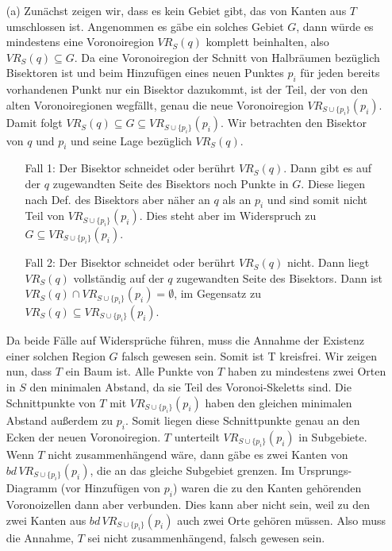 \documentclass{article}
\begin{document}
\begin{itemize}
\item[(a)] Zun\"achst zeigen wir, dass es kein Gebiet gibt, das von Kanten aus $T$ umschlossen ist. Angenommen es g\"abe ein solches Gebiet $G$, dann w\"urde es mindestens eine Voronoiregion $VR_S(q)$ komplett beinhalten, also $VR_S(q) \subseteq G$. Da eine Voronoiregion der Schnitt von Halbr\"aumen bez\"uglich Bisektoren ist und beim Hinzuf\"ugen eines neuen Punktes $p_i$ f\"ur jeden bereits vorhandenen Punkt nur ein Bisektor dazukommt, ist der Teil, der von den alten Voronoiregionen wegf\"allt, genau die neue Voronoiregion $VR_{S\cup\{p_i\}}(p_i)$. Damit folgt $VR_S(q) \subseteq G \subseteq VR_{S\cup\{p_i\}}(p_i)$. Wir betrachten den Bisektor von $q$ und $p_i$ und seine Lage bez\"uglich $VR_S(q)$.
\begin{itemize}
\item[Fall 1:] Der Bisektor schneidet oder ber\"uhrt $VR_S(q)$. Dann gibt es auf der $q$ zugewandten Seite des Bisektors noch Punkte in $G$. Diese liegen nach Def. des Bisektors aber n\"aher an $q$ als an $p_i$ und sind somit nicht Teil von $VR_{S\cup\{p_i\}}(p_i)$. Dies steht aber im Widerspruch zu $G \subseteq VR_{S\cup\{p_i\}}(p_i)$.
\item[Fall 2:] Der Bisektor schneidet oder ber\"uhrt $VR_S(q)$ nicht. Dann liegt $VR_S(q)$ vollst\"andig auf der $q$ zugewandten Seite des Bisektors. Dann ist $VR_S(q) \cap VR_{S\cup\{p_i\}}(p_i) = \emptyset$, im Gegensatz zu $VR_S(q) \subseteq VR_{S\cup\{p_i\}}(p_i)$.
\end{itemize}
Da beide F\"alle auf Widerspr\"uche f\"uhren, muss die Annahme der Existenz einer solchen Region $G$ falsch gewesen sein. Somit ist T kreisfrei.
Wir zeigen nun, dass $T$ ein Baum ist. Alle Punkte von $T$ haben zu mindestens zwei Orten in $S$ den minimalen Abstand, da sie Teil des Voronoi-Skeletts sind. Die Schnittpunkte von $T$ mit $VR_{S\cup\{p_i\}}(p_i)$ haben den gleichen minimalen Abstand au\ss erdem zu $p_i$. Somit liegen diese Schnittpunkte genau an den Ecken der neuen Voronoiregion. $T$ unterteilt $VR_{S\cup\{p_i\}}(p_i)$ in Subgebiete. Wenn $T$ nicht zusammenh\"angend w\"are, dann g\"abe es zwei Kanten von $bd\,VR_{S\cup\{p_i\}}(p_i)$, die an das gleiche Subgebiet grenzen. Im Ursprungs-Diagramm (vor Hinzuf\"ugen von $p_i$) waren die zu den Kanten geh\"orenden Voronoizellen dann aber verbunden. Dies kann aber nicht sein, weil zu den zwei Kanten aus $bd\,VR_{S\cup\{p_i\}}(p_i)$ auch zwei Orte geh\"oren m\"ussen. Also muss die Annahme, $T$ sei nicht zusammenh\"angend, falsch gewesen sein.\\

\end{itemize}
\end{document}
